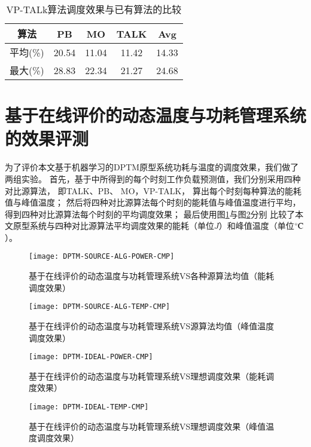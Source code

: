 \begin{table}
\centering
\caption{VP-TALk算法调度效果与已有算法的比较}
\begin{tabular}{c c c c c}
\hline\hline
算法 & PB & MO & TALK & Avg \\ [0.5ex]
\hline
平均(\%) & 20.54 & 11.04 & 11.42 & 14.33 \\
最大(\%) & 28.83 & 22.34 & 21.27 & 24.68 \\
\hline
\end{tabular}
\label{tab:chap3:vp-talk-cmp}
\end{table}

\section{基于在线评价的动态温度与功耗管理系统的效果评测}
为了评价本文基于机器学习的DPTM原型系统功耗与温度的调度效果，我们做了两组实验。
首先，基于中所得到的每个时刻工作负载预测值，我们分别采用四种对比源算法， 即TALK、PB、 MO，VP-TALK， 算出每个时刻每种算法的能耗值与峰值温度； 然后将四种对比源算法每个时刻的能耗值与峰值温度进行平均，得到四种对比源算法每个时刻的平均调度效果； 最后使用图\ref{fig:dptm-source-alg-power-cmp}与图\ref{fig:dptm-source-alg-temp-cmp}分别 比较了本文原型系统与四种对比源算法平均调度效果的能耗（单位$J$）和峰值温度（单位$\celsius$）。
\begin{figure}[H]
  \centering
  \texttt{[image: DPTM-SOURCE-ALG-POWER-CMP]}
  \caption{基于在线评价的动态温度与功耗管理系统VS各种源算法均值（能耗调度效果）}
  \label{fig:dptm-source-alg-power-cmp}
\end{figure}
\begin{figure}[H]
  \centering
  \texttt{[image: DPTM-SOURCE-ALG-TEMP-CMP]}
  \caption{基于在线评价的动态温度与功耗管理系统VS源算法均值（峰值温度调度效果）}
  \label{fig:dptm-source-alg-temp-cmp}
\end{figure}
\begin{figure}[H]
  \centering
  \texttt{[image: DPTM-IDEAL-POWER-CMP]}
  \caption{基于在线评价的动态温度与功耗管理系统VS理想调度效果（能耗调度效果）}
  \label{fig:dptm-ideal-power-cmp}
\end{figure}
\begin{figure}[H]
  \centering
  \texttt{[image: DPTM-IDEAL-TEMP-CMP]}
  \caption{基于在线评价的动态温度与功耗管理系统VS理想调度效果（峰值温度调度效果）}
  \label{fig:dptm-ideal-temp-cmp}
\end{figure}

